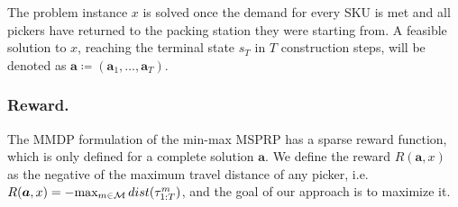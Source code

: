The problem instance $x$ is solved once the demand for every SKU is met and all pickers have returned to the packing station they were starting from. A feasible solution to $x$, reaching the terminal state $s_T$ in $T$ construction steps, will be denoted as $\bm{a} \coloneqq (\bm{a}_1, \ldots, \bm{a}_{T})$. 
\vspace{-4.5mm}
\subsubsection{Reward.}
The MMDP formulation of the min-max MSPRP has a sparse reward function, which is only defined for a complete solution $\bm{a}$. We define the reward $R(\bm{a}, x)$ as the negative of the maximum travel distance of any picker, i.e. $R(\bm{a},x) = - \text{max}_{m \in \mathcal{M}} \, dist(\tau^m_{1:T})$, and the goal of our approach is to maximize it.
